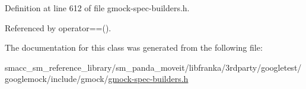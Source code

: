 Definition at line 612 of file gmock-\/spec-\/builders.\+h.



Referenced by operator==().



The documentation for this class was generated from the following file\+:\begin{DoxyCompactItemize}
\item 
smacc\+\_\+sm\+\_\+reference\+\_\+library/sm\+\_\+panda\+\_\+moveit/libfranka/3rdparty/googletest/googlemock/include/gmock/\hyperlink{gmock-spec-builders_8h}{gmock-\/spec-\/builders.\+h}\end{DoxyCompactItemize}

